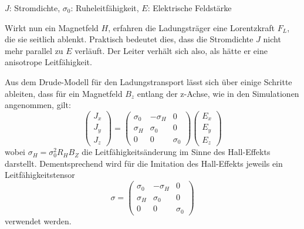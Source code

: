 \documentclass[12pt, a4paper]{article}
\renewcommand{\footnotesize}{\fontsize{10pt}{12pt}\selectfont}
\begin{document}
\vspace{-0.8em}
\begin{center}
	\footnotesize
	$J$: Stromdichte, $\sigma_0$: Ruheleitfähigkeit, $E$: Elektrische Feldstärke
\end{center}
{
\raggedright
Wirkt nun ein Magnetfeld $H$, erfahren die Ladungsträger eine Lorentzkraft $F_L$, die sie seitlich ablenkt. Praktisch bedeutet dies, dass die Stromdichte $J$ nicht mehr parallel zu $E$ verläuft. Der Leiter verhält sich also, als hätte er eine anisotrope Leitfähigkeit.}\newline
Aus dem Drude-Modell für den Ladungstransport lässt sich über einige Schritte ableiten, dass für ein Magnetfeld $B_z$ entlang der z-Achse, wie in den Simulationen angenommen, gilt:
\begin{equation}
	\begin{pmatrix} J_x \\ J_y \\ J_z \end{pmatrix}=\begin{pmatrix} \sigma_0 & -\sigma_H & 0 \\ \sigma_H & \sigma_0 & 0 \\ 0 & 0 & \sigma_0\end{pmatrix} \begin{pmatrix} E_x \\ E_y \\ E_z \end{pmatrix}
	\tag{4.10}
	\label{4.10}
\end{equation}
wobei $\sigma_H=\sigma_0^2R_HB_Z$ die Leitfähigkeitsänderung im Sinne des Hall-Effekts darstellt.\newline%
Dementsprechend wird für die Imitation des Hall-Effekts jeweils ein Leitfähigkeitstensor 
\begin{equation}
	\sigma=\begin{pmatrix} \sigma_0 & -\sigma_H & 0 \\ \sigma_H & \sigma_0 & 0 \\ 0 & 0 & \sigma_0\end{pmatrix}
	\tag{4.11}
	\label{4.11}
\end{equation}
verwendet werden.
\end{document}
